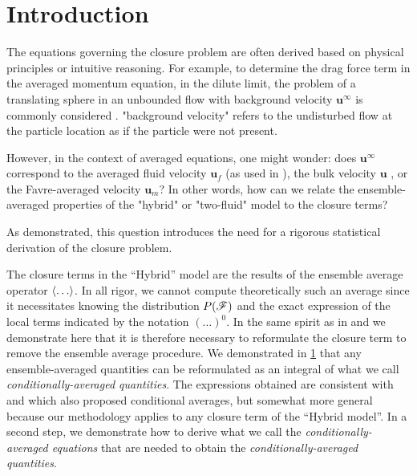 \section{Introduction}
\label{ap:Closure_problem}

The equations governing the closure problem are often derived based on physical principles or intuitive reasoning.
For example, to determine the drag force term in the averaged momentum equation, in the dilute limit, the problem of a translating sphere in an unbounded flow with background velocity $\textbf{u}^\infty$ is commonly considered \citep{stone2001inertial,raja2010inertial,guazzelli2011}.
"background velocity" refers to the undisturbed flow at the particle location as if the particle were not present.


However, in the context of averaged equations, one might wonder: does $\textbf{u}^\infty$ correspond to the averaged fluid velocity $\textbf{u}_f$ (as used in \citet{jackson1997locally,zhang1997momentum}), the bulk velocity $\textbf{u}$ \citep{kim1985modelling}, or the Favre-averaged velocity $\textbf{u}_m$?
In other words, how can we relate the ensemble-averaged properties of the "hybrid" or "two-fluid" model to the closure terms?

As demonstrated, this question introduces the need for a rigorous statistical derivation of the closure problem.

The closure terms in the ``Hybrid'' model are the results of the ensemble average operator $\left<\ldots\right>$. 
In all rigor, we cannot compute theoretically such an average since it necessitates knowing the distribution $P(\mathscr{F})$ and the exact expression of the local terms indicated by the notation $(\ldots)^0$. 
In the same spirit as in \citet{buyevich1979flow,lhuillier1992ensemble,batchelor1972sedimentation,hinch1977averaged} and \citet{zhang1994averaged} we demonstrate here that it is therefore necessary to reformulate the closure term to remove the ensemble average procedure. 
We demonstrated in \ref{ap:Closure_problem} that any ensemble-averaged quantities can be reformulated as an integral of what we call \textit{conditionally-averaged quantities}. 
The expressions obtained are  consistent with \citet{batchelor1972sedimentation,hinch1977averaged} and \citet[Appendix A]{zhang1994averaged} which also proposed conditional averages, but somewhat more general because our methodology applies to any closure term of the ``Hybrid model''. 
In a second step, we demonstrate how to derive what we call the \textit{conditionally-averaged equations} that are needed to obtain the \textit{conditionally-averaged quantities}. 

